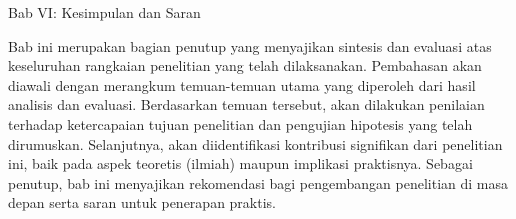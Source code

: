 Bab VI: Kesimpulan dan Saran

Bab ini merupakan bagian penutup yang menyajikan sintesis dan evaluasi atas keseluruhan rangkaian penelitian yang telah dilaksanakan. Pembahasan akan diawali dengan merangkum temuan-temuan utama yang diperoleh dari hasil analisis dan evaluasi. Berdasarkan temuan tersebut, akan dilakukan penilaian terhadap ketercapaian tujuan penelitian dan pengujian hipotesis yang telah dirumuskan. Selanjutnya, akan diidentifikasi kontribusi signifikan dari penelitian ini, baik pada aspek teoretis (ilmiah) maupun implikasi praktisnya. Sebagai penutup, bab ini menyajikan rekomendasi bagi pengembangan penelitian di masa depan serta saran untuk penerapan praktis.



